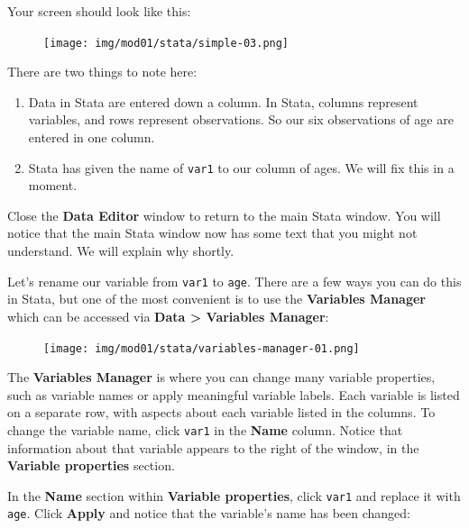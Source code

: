 \documentclass[
  a4paper,
]{memoir}
\providecommand{\tightlist}{%
  \setlength{\itemsep}{0pt}\setlength{\parskip}{0pt}}\usepackage{longtable,booktabs,array}
\begin{document}
Your screen should look like this:

\begin{figure}[H]

{\centering \texttt{[image: img/mod01/stata/simple-03.png]}

}

\end{figure}

There are two things to note here:

\begin{enumerate}
\def\labelenumi{\arabic{enumi}.}
\tightlist
\item
  Data in Stata are entered down a column. In Stata, columns represent
  variables, and rows represent observations. So our six observations of
  age are entered in one column.
\item
  Stata has given the name of \texttt{var1} to our column of ages. We
  will fix this in a moment.
\end{enumerate}

Close the \textbf{Data Editor} window to return to the main Stata
window. You will notice that the main Stata window now has some text
that you might not understand. We will explain why shortly.

Let's rename our variable from \texttt{var1} to \texttt{age}. There are
a few ways you can do this in Stata, but one of the most convenient is
to use the \textbf{Variables Manager} which can be accessed via
\textbf{Data \textgreater{} Variables Manager}:

\begin{figure}[H]

{\centering \texttt{[image: img/mod01/stata/variables-manager-01.png]}

}

\end{figure}

The \textbf{Variables Manager} is where you can change many variable
properties, such as variable names or apply meaningful variable labels.
Each variable is listed on a separate row, with aspects about each
variable listed in the columns. To change the variable name, click
\texttt{var1} in the \textbf{Name} column. Notice that information about
that variable appears to the right of the window, in the
\textbf{Variable properties} section.

In the \textbf{Name} section within \textbf{Variable properties}, click
\texttt{var1} and replace it with \texttt{age}. Click \textbf{Apply} and
notice that the variable's name has been changed:
\end{document}
